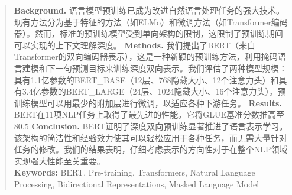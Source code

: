 \begin{abstract}
\textbf{Background.} 语言模型预训练已成为改进自然语言处理任务的强大技术。现有方法分为基于特征的方法（如ELMo）和微调方法（如Transformer编码器）。然而，标准的预训练模型受到单向架构的限制，这限制了预训练期间可以实现的上下文理解深度。
\textbf{Methods.} 我们提出了BERT（来自Transformer的双向编码器表示），这是一种新颖的预训练方法，利用掩码语言建模和下一句预测目标来训练深度双向表示。我们评估了两种模型规模：具有1.1亿参数的BERT_BASE（12层、768隐藏大小、12个注意力头）和具有3.4亿参数的BERT_LARGE（24层、1024隐藏大小、16个注意力头）。预训练模型可以用最少的附加层进行微调，以适应各种下游任务。
\textbf{Results.} BERT在11项NLP任务上取得了最先进的性能。它将GLUE基准分数推高至80.5%
\textbf{Conclusion.} BERT证明了深度双向预训练显著推进了语言表示学习。该架构的简洁性和经验效力使其可以轻松应用于各种任务，而无需大量针对任务的修改。我们的结果表明，仔细考虑表示的方向性对于在整个NLP领域实现强大性能至关重要。
\\
\textbf{Keywords:} BERT, Pre-training, Transformers, Natural Language Processing, Bidirectional Representations, Masked Language Model
\end{abstract}

